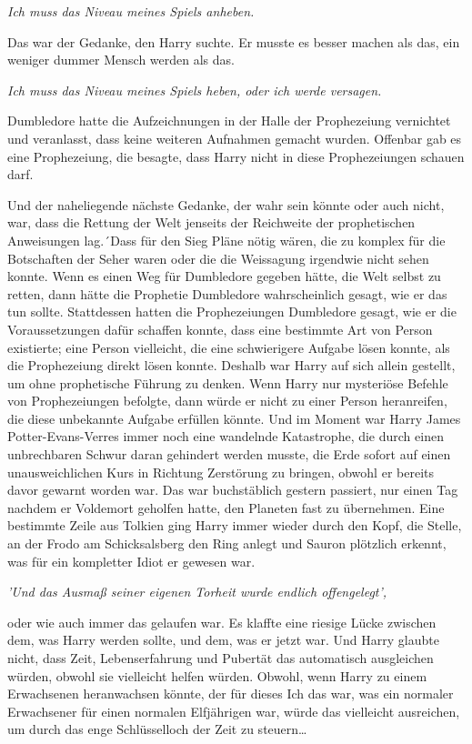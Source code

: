 {\emph{Ich muss das Niveau meines Spiels anheben.}

Das war der Gedanke, den Harry suchte. Er musste es besser machen als das, ein weniger dummer Mensch werden als das.

\emph{Ich muss das Niveau meines Spiels heben, oder ich werde versagen.}

Dumbledore hatte die Aufzeichnungen in der Halle der Prophezeiung vernichtet und veranlasst, dass keine weiteren Aufnahmen gemacht wurden. Offenbar gab es eine Prophezeiung, die besagte, dass Harry nicht in diese Prophezeiungen schauen darf.

Und der naheliegende nächste Gedanke, der wahr sein könnte oder auch nicht, war, dass die Rettung der Welt jenseits der Reichweite der prophetischen Anweisungen lag.´Dass für den Sieg Pläne nötig wären, die zu komplex für die Botschaften der Seher waren oder die die Weissagung irgendwie nicht sehen konnte. Wenn es einen Weg für Dumbledore gegeben hätte, die Welt selbst zu retten, dann hätte die Prophetie Dumbledore wahrscheinlich gesagt, wie er das tun sollte. Stattdessen hatten die Prophezeiungen Dumbledore gesagt, wie er die Voraussetzungen dafür schaffen konnte, dass eine bestimmte Art von Person existierte; eine Person vielleicht, die eine schwierigere Aufgabe lösen konnte, als die Prophezeiung direkt lösen konnte. Deshalb war Harry auf sich allein gestellt, um ohne prophetische Führung zu denken. Wenn Harry nur mysteriöse Befehle von Prophezeiungen befolgte, dann würde er nicht zu einer Person heranreifen, die diese unbekannte Aufgabe erfüllen könnte. Und im Moment war Harry James Potter-Evans-Verres immer noch eine wandelnde Katastrophe, die durch einen unbrechbaren Schwur daran gehindert werden musste, die Erde sofort auf einen unausweichlichen Kurs in Richtung Zerstörung zu bringen, obwohl er bereits davor gewarnt worden war. Das war buchstäblich gestern passiert, nur einen Tag nachdem er Voldemort geholfen hatte, den Planeten fast zu übernehmen. Eine bestimmte Zeile aus Tolkien ging Harry immer wieder durch den Kopf, die Stelle, an der Frodo am Schicksalsberg den Ring anlegt und Sauron plötzlich erkennt, was für ein kompletter Idiot er gewesen war.

\emph{'Und das Ausmaß seiner eigenen Torheit wurde endlich offengelegt',}

oder wie auch immer das gelaufen war. Es klaffte eine riesige Lücke zwischen dem, was Harry werden sollte, und dem, was er jetzt war. Und Harry glaubte nicht, dass Zeit, Lebenserfahrung und Pubertät das automatisch ausgleichen würden, obwohl sie vielleicht helfen würden. Obwohl, wenn Harry zu einem Erwachsenen heranwachsen könnte, der für dieses Ich das war, was ein normaler Erwachsener für einen normalen Elfjährigen war, würde das vielleicht ausreichen, um durch das enge Schlüsselloch der Zeit zu steuern…

}
